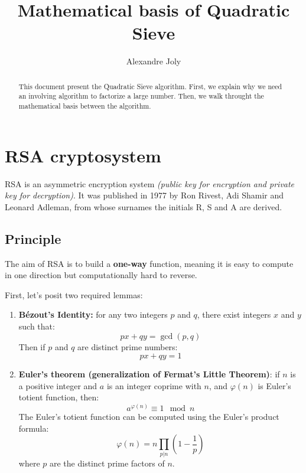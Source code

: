 \documentclass[a4paper, 11pt]{article}
\title{Mathematical basis of Quadratic Sieve}
\author{Alexandre Joly}
\begin{document}
\maketitle

\begin{abstract}
    This document present the Quadratic Sieve algorithm. First, we explain why we need an involving algorithm to factorize a large number. Then, we walk throught the mathematical basis between the algorithm.
\end{abstract}

\tableofcontents
\newpage


\section{RSA cryptosystem}

RSA is an asymmetric encryption system \textit{(public key for encryption and private key for decryption)}. It was published in 1977 by Ron Rivest, Adi Shamir and Leonard Adleman, from whose surnames the initials R, S and A are derived.

\subsection{Principle}
The aim of RSA is to build a \textbf{one-way} function, meaning it is easy to compute in one direction but computationally hard to reverse.

First, let's posit two required lemmas:
\begin{enumerate}
    \item \textbf{Bézout's Identity:} for any two integers $p$ and $q$, there exist integers $x$ and $y$ such that:
    \begin{equation}
        px+qy= \gcd(p,q) 
    \end{equation}
    Then if $p$ and $q$ are distinct prime numbers:
    \begin{equation}
        px+qy= 1
    \end{equation}
    \item \textbf{Euler's theorem (generalization of Fermat's Little Theorem)}: if $n$ is a positive integer and $a$ is an integer coprime with $n$, and $\varphi(n)$ is Euler's totient function, then:
    \begin{equation}
        a^{\varphi(n)} \equiv 1 \mod n
    \end{equation}
    The Euler's totient function can be computed using the Euler's product formula:
    \begin{equation}
        \varphi(n) = n \prod_{p|n}\left(1-\frac{1}{p}\right)
    \end{equation}
    where $p$ are the distinct prime factors of $n$.
\end{enumerate}
\end{document}
